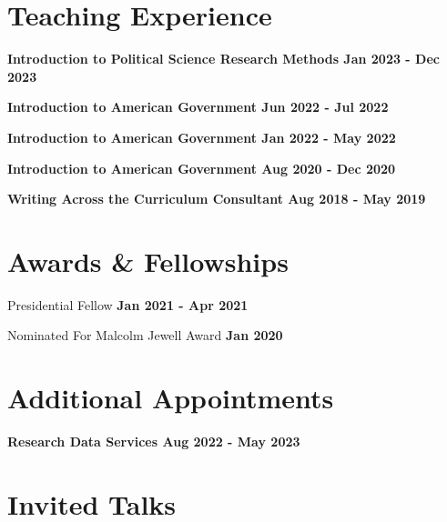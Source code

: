 \documentclass[margin]{res}
\newcommand{\fullhrulefill}{%
  \hspace*{-\sectionwidth}\hrulefill%
  }
\begin{document}
\begin{resume}
\fullhrulefill

\section {Teaching Experience}

\textbf {Introduction to Political Science Research Methods \hfill {Jan 2023 - Dec 2023} \\ }

\textbf {Introduction to American Government \hfill {Jun 2022 - Jul 2022} \\ }

\textbf {Introduction to American Government \hfill {Jan 2022 - May 2022} \\ }


\textbf {Introduction to American Government \hfill {Aug 2020 - Dec 2020} \\ }

\textbf {Writing Across the Curriculum Consultant \hfill {Aug 2018 - May 2019} \\ }

\fullhrulefill

\section{Awards \& Fellowships}


Presidential Fellow \hfill{\textbf{Jan 2021 - Apr 2021 }} \\  

Nominated For Malcolm Jewell Award \hfill{\textbf{Jan 2020}} \\

\fullhrulefill

\section{Additional Appointments}

\textbf{Research Data Services \hfill {Aug 2022 - May 2023} \\ }

\fullhrulefill



\section{Invited Talks}


\end{resume}
\end{document}
